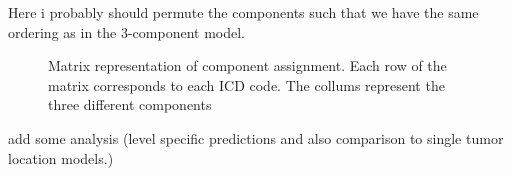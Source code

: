 \documentclass[
  sn-mathphys-num,
]{sn-jnl}
\begin{document}
Here i probably should permute the components such that we have the same
ordering as in the 3-component model.

\begin{figure}


\caption{\label{fig-4-matrix}Matrix representation of component
assignment. Each row of the matrix corresponds to each ICD code. The
collums represent the three different components}

\end{figure}%

add some analysis (level specific predictions and also comparison to
single tumor location models.)


  
\end{document}
